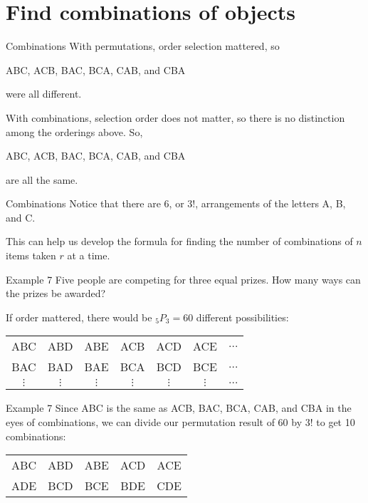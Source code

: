 \documentclass[t]{beamer}
\begin{document}
\section{Find combinations of objects}

\begin{frame}{Combinations}
With permutations, order selection mattered, so 
\begin{center}
ABC, ACB, BAC, BCA, CAB, and CBA
\end{center}
were all different.	\newline\\	\pause

With combinations, selection order does not matter, so there is no distinction among the orderings above. So,
\begin{center}
ABC, ACB, BAC, BCA, CAB, and CBA
\end{center}
are all the same.
\end{frame}

\begin{frame}{Combinations}
Notice that there are 6, or $3!$, arrangements of the letters A, B, and C. \newline\\	\pause

This can help us develop the formula for finding the number of combinations of $n$ items taken $r$ at a time.
\end{frame}

\begin{frame}{Example 7}
Five people are competing for three equal prizes. How many ways can the prizes be awarded?	\newline\\	\pause

If order mattered, there would be $_5P_3 = 60$ different possibilities:
\begin{center}
\begin{tabular}{ccccccc}
ABC & ABD & ABE & ACB & ACD & ACE & $\dots$ \\
BAC & BAD & BAE & BCA & BCD & BCE & $\dots$ \\
$\vdots$ & $\vdots$ & $\vdots$ & $\vdots$ & $\vdots$ & $\vdots$ & $\dots$ 
\end{tabular}
\end{center}
\end{frame}

\begin{frame}{Example 7}
Since ABC is the same as ACB, BAC, BCA, CAB, and CBA in the eyes of combinations, we can divide our permutation result of 60 by 3! to get \alert{10 combinations}:

\begin{center}
\begin{tabular}{ccccc}
ABC & ABD & ABE & ACD & ACE \\
ADE & BCD & BCE & BDE & CDE \\
\end{tabular}
\end{center}
\end{frame}
\end{document}
